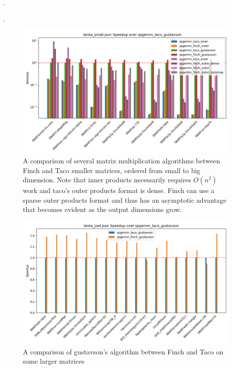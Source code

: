 .

.
\begin{figure}
    \label{spgemm_small}
	\includegraphics[width=\linewidth]{spgemm_small_speedup_log_scale.png}
    \caption{A comparison of several matrix multiplication algorithms between Finch and Taco smaller matrices, ordered from small to big dimension. Note that inner products necessarily requires $O(n^2)$ work and taco's outer products format is dense. Finch can use a sparse outer products format and thus has an asymptotic advantage that becomes evident as the output dimensions grow.}
\end{figure}

\begin{figure}
\label{spgemm_large}
	\includegraphics[width=\linewidth]{spgemm_joel_speedup.png}
    \caption{A comparison of gustavson's algorithm between Finch and Taco on some larger matrices}
\end{figure}

